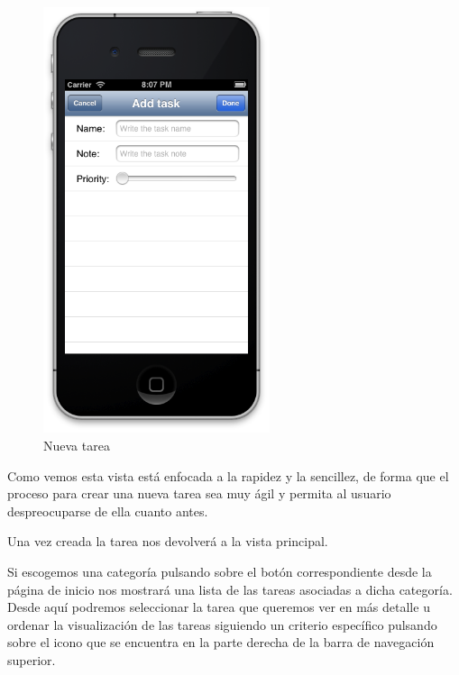 \documentclass[parskip=half*]{scrartcl}
\begin{document}
\begin{figure}[h]
	\centering
	\includegraphics[height=12.5cm]{add.png}
	\caption{Nueva tarea}
\end{figure}

Como vemos esta vista est\'a enfocada a la rapidez y la sencillez, de forma que el proceso para crear una nueva tarea sea muy \'agil y permita al usuario despreocuparse de ella cuanto antes.

Una vez creada la tarea nos devolverá a la vista principal.

Si escogemos una categor\'ia pulsando sobre el bot\'on correspondiente desde la página de inicio nos mostrar\'a una lista de las tareas asociadas a dicha categor\'ia. Desde aqu\'i podremos seleccionar la tarea que queremos ver en m\'as detalle u ordenar la visualizaci\'on de las tareas siguiendo un criterio espec\'ifico pulsando sobre el icono que se encuentra en la parte derecha de la barra de navegaci\'on superior.
\end{document}
